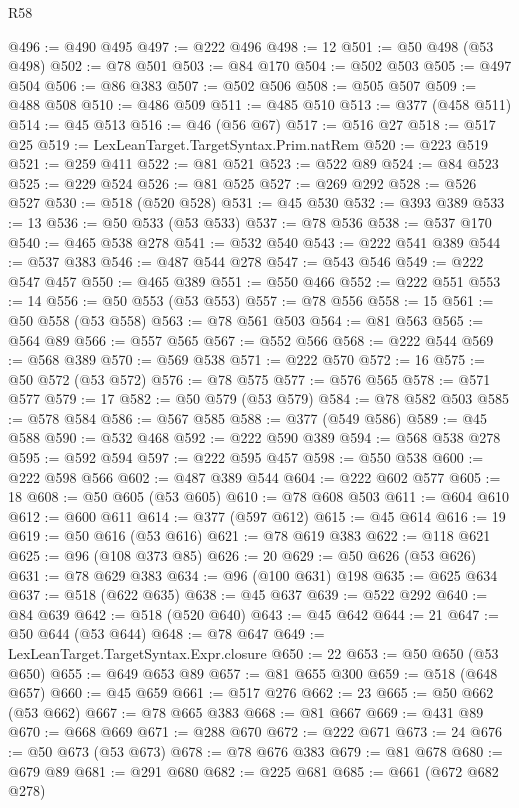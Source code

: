\begin{lexlean}{R58}
\begin{coremodule}
@496 := @490 @495
@497 := @222 @496
@498 := 12
@501 := @50 @498 (@53 @498)
@502 := @78 @501
@503 := @84 @170
@504 := @502 @503
@505 := @497 @504
@506 := @86 @383
@507 := @502 @506
@508 := @505 @507
@509 := @488 @508
@510 := @486 @509
@511 := @485 @510
@513 := @377 (@458 @511)
@514 := @45 @513
@516 := @46 (@56 @67)
@517 := @516 @27
@518 := @517 @25
@519 := LexLeanTarget.TargetSyntax.Prim.natRem
@520 := @223 @519
@521 := @259 @411
@522 := @81 @521
@523 := @522 @89
@524 := @84 @523
@525 := @229 @524
@526 := @81 @525
@527 := @269 @292
@528 := @526 @527
@530 := @518 (@520 @528)
@531 := @45 @530
@532 := @393 @389
@533 := 13
@536 := @50 @533 (@53 @533)
@537 := @78 @536
@538 := @537 @170
@540 := @465 @538 @278
@541 := @532 @540
@543 := @222 @541 @389
@544 := @537 @383
@546 := @487 @544 @278
@547 := @543 @546
@549 := @222 @547 @457
@550 := @465 @389
@551 := @550 @466
@552 := @222 @551
@553 := 14
@556 := @50 @553 (@53 @553)
@557 := @78 @556
@558 := 15
@561 := @50 @558 (@53 @558)
@563 := @78 @561 @503
@564 := @81 @563
@565 := @564 @89
@566 := @557 @565
@567 := @552 @566
@568 := @222 @544
@569 := @568 @389
@570 := @569 @538
@571 := @222 @570
@572 := 16
@575 := @50 @572 (@53 @572)
@576 := @78 @575
@577 := @576 @565
@578 := @571 @577
@579 := 17
@582 := @50 @579 (@53 @579)
@584 := @78 @582 @503
@585 := @578 @584
@586 := @567 @585
@588 := @377 (@549 @586)
@589 := @45 @588
@590 := @532 @468
@592 := @222 @590 @389
@594 := @568 @538 @278
@595 := @592 @594
@597 := @222 @595 @457
@598 := @550 @538
@600 := @222 @598 @566
@602 := @487 @389 @544
@604 := @222 @602 @577
@605 := 18
@608 := @50 @605 (@53 @605)
@610 := @78 @608 @503
@611 := @604 @610
@612 := @600 @611
@614 := @377 (@597 @612)
@615 := @45 @614
@616 := 19
@619 := @50 @616 (@53 @616)
@621 := @78 @619 @383
@622 := @118 @621
@625 := @96 (@108 @373 @85)
@626 := 20
@629 := @50 @626 (@53 @626)
@631 := @78 @629 @383
@634 := @96 (@100 @631) @198
@635 := @625 @634
@637 := @518 (@622 @635)
@638 := @45 @637
@639 := @522 @292
@640 := @84 @639
@642 := @518 (@520 @640)
@643 := @45 @642
@644 := 21
@647 := @50 @644 (@53 @644)
@648 := @78 @647
@649 := LexLeanTarget.TargetSyntax.Expr.closure
@650 := 22
@653 := @50 @650 (@53 @650)
@655 := @649 @653 @89
@657 := @81 @655 @300
@659 := @518 (@648 @657)
@660 := @45 @659
@661 := @517 @276
@662 := 23
@665 := @50 @662 (@53 @662)
@667 := @78 @665 @383
@668 := @81 @667
@669 := @431 @89
@670 := @668 @669
@671 := @288 @670
@672 := @222 @671
@673 := 24
@676 := @50 @673 (@53 @673)
@678 := @78 @676 @383
@679 := @81 @678
@680 := @679 @89
@681 := @291 @680
@682 := @225 @681
@685 := @661 (@672 @682 @278)

\end{coremodule}
\end{lexlean}
